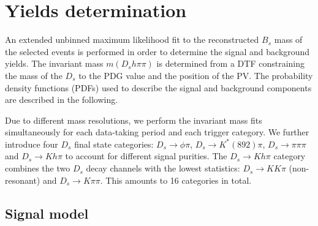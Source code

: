 
\section{Yields determination}
\label{sec:massFits}

An extended unbinned maximum likelihood fit to the reconstructed $B_s$ mass of the selected events is performed in order to determine the signal and background yields.
The invariant mass $m(D_s h \pi \pi)$ is determined from a DTF constraining the mass of the $D_s$ to the PDG value and the position of the PV. 
The probability density functions (PDFs) used to describe the signal and background components are described in the following.

Due to different mass resolutions, we perform the invariant mass fits simultaneously for each data-taking period and each trigger category. 
We further introduce four $D_s$ final state categories:
$D_s \to \phi \pi$, $D_s \to K^*(892) \pi$, $D_s \to \pi \pi \pi$ and $D_s \to K h \pi$
to account for different signal purities. 
The $D_s \to K h \pi$ category combines the two $D_s$ decay channels with the lowest statistics: $D_s \to K K \pi$ (non-resonant) and $D_s \to K \pi \pi$.
This amounts to 16 categories in total.



\subsection{Signal model}
\label{subsec:signalModel}

